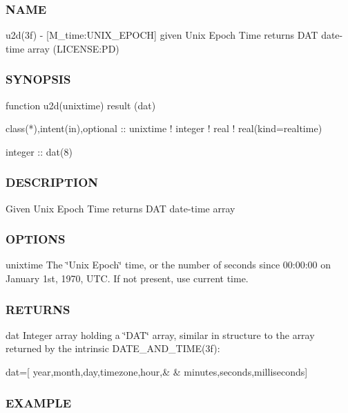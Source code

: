 \subsubsection*{N\+A\+ME}

u2d(3f) -\/ \mbox{[}M\+\_\+time\+:U\+N\+I\+X\+\_\+\+E\+P\+O\+CH\mbox{]} given Unix Epoch Time returns D\+AT date-\/time array (L\+I\+C\+E\+N\+SE\+:PD) 

\subsubsection*{S\+Y\+N\+O\+P\+S\+IS}

\begin{DoxyVerb}function u2d(unixtime) result (dat)

 class(*),intent(in),optional      :: unixtime
 ! integer
 ! real
 ! real(kind=realtime)

 integer                           :: dat(8)
\end{DoxyVerb}


\subsubsection*{D\+E\+S\+C\+R\+I\+P\+T\+I\+ON}

Given Unix Epoch Time returns D\+AT date-\/time array

\subsubsection*{O\+P\+T\+I\+O\+NS}

unixtime The \char`\"{}\+Unix Epoch\char`\"{} time, or the number of seconds since 00\+:00\+:00 on January 1st, 1970, U\+TC. If not present, use current time.

\subsubsection*{R\+E\+T\+U\+R\+NS}

dat Integer array holding a \char`\"{}\+D\+A\+T\char`\"{} array, similar in structure to the array returned by the intrinsic D\+A\+T\+E\+\_\+\+A\+N\+D\+\_\+\+T\+I\+M\+E(3f)\+:

dat=\mbox{[} year,month,day,timezone,hour,\& \& minutes,seconds,milliseconds\mbox{]}

\subsubsection*{E\+X\+A\+M\+P\+LE}


